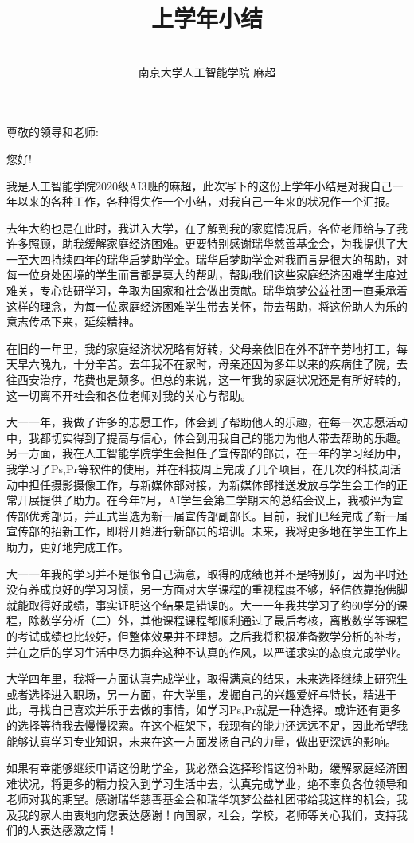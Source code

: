 \documentclass[12pt,a4paper,fontset=none]{ctexart}
\title{\textbf{上学年小结}}
\author{
\\
\Large{南京大学人工智能学院 麻超}
}
\begin{document}
\maketitle
\setcounter{page}{1}

\date{}

\noindent
尊敬的领导和老师:

您好!

我是人工智能学院2020级AI3班的麻超，此次写下的这份上学年小结是对我自己一年以来的各种工作，各种得失作一个小结，对我自己一年来的状况作一个汇报。

去年大约也是在此时，我进入大学，在了解到我的家庭情况后，各位老师给与了我许多照顾，助我缓解家庭经济困难。更要特别感谢瑞华慈善基金会，为我提供了大一至大四持续四年的瑞华启梦助学金。瑞华启梦助学金对我而言是很大的帮助，对每一位身处困境的学生而言都是莫大的帮助，帮助我们这些家庭经济困难学生度过难关，专心钻研学习，争取为国家和社会做出贡献。瑞华筑梦公益社团一直秉承着这样的理念，为每一位家庭经济困难学生带去关怀，带去帮助，将这份助人为乐的意志传承下来，延续精神。

在旧的一年里，我的家庭经济状况略有好转，父母亲依旧在外不辞辛劳地打工，每天早六晚九，十分辛苦。去年我不在家时，母亲还因为多年以来的疾病住了院，去往西安治疗，花费也是颇多。但总的来说，这一年我的家庭状况还是有所好转的，这一切离不开社会和各位老师对我的关心与帮助。

大一一年，我做了许多的志愿工作，体会到了帮助他人的乐趣，在每一次志愿活动中，我都切实得到了提高与信心，体会到用我自己的能力为他人带去帮助的乐趣。另一方面，我在人工智能学院学生会担任了宣传部的部员，在一年的学习经历中，我学习了Ps,Pr等软件的使用，并在科技周上完成了几个项目，在几次的科技周活动中担任摄影摄像工作，与新媒体部对接，为新媒体部推送发放与学生会工作的正常开展提供了助力。在今年7月，AI学生会第二学期末的总结会议上，我被评为宣传部优秀部员，并正式当选为新一届宣传部副部长。目前，我们已经完成了新一届宣传部的招新工作，即将开始进行新部员的培训。未来，我将更多地在学生工作上助力，更好地完成工作。

大一一年我的学习并不是很令自己满意，取得的成绩也并不是特别好，因为平时还没有养成良好的学习习惯，另一方面对大学课程的重视程度不够，轻信依靠抱佛脚就能取得好成绩，事实证明这个结果是错误的。大一一年我共学习了约60学分的课程，除数学分析（二）外，其他课程课程都顺利通过了最后考核，离散数学等课程的考试成绩也比较好，但整体效果并不理想。之后我将积极准备数学分析的补考，并在之后的学习生活中尽力摒弃这种不认真的作风，以严谨求实的态度完成学业。

大学四年里，我将一方面认真完成学业，取得满意的结果，未来选择继续上研究生或者选择进入职场，另一方面，在大学里，发掘自己的兴趣爱好与特长，精进于此，寻找自己喜欢并乐于去做的事情，如学习Ps,Pr就是一种选择。或许还有更多的选择等待我去慢慢探索。在这个框架下，我现有的能力还远远不足，因此希望我能够认真学习专业知识，未来在这一方面发扬自己的力量，做出更深远的影响。

如果有幸能够继续申请这份助学金，我必然会选择珍惜这份补助，缓解家庭经济困难状况，将更多的精力投入到学习生活中去，认真完成学业，绝不辜负各位领导和老师对我的期望。感谢瑞华慈善基金会和瑞华筑梦公益社团带给我这样的机会，我及我的家人由衷地向您表达感谢！向国家，社会，学校，老师等关心我们，支持我们的人表达感激之情！
\end{document}
